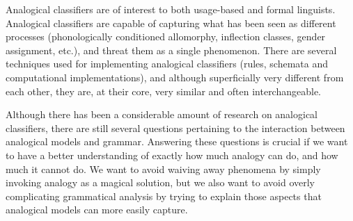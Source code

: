Analogical classifiers are of interest to both usage-based and formal linguists. Analogical classifiers are capable of capturing what has been seen as different processes (phonologically conditioned allomorphy, inflection classes, gender assignment, etc.), and threat them as a single phenomenon. There are several techniques used for implementing analogical classifiers (rules, schemata and computational implementations), and although superficially very different from each other, they are, at their core, very similar and often interchangeable.

Although there has been a considerable amount of research on analogical classifiers, there are still several questions pertaining to the interaction between analogical models and grammar. Answering these questions is crucial if we want to have a better understanding of exactly how much analogy can do, and how much it cannot do. We want to avoid waiving away phenomena by simply invoking analogy as a magical solution, but we also want to avoid overly complicating grammatical analysis by trying to explain those aspects that analogical models can more easily capture.

